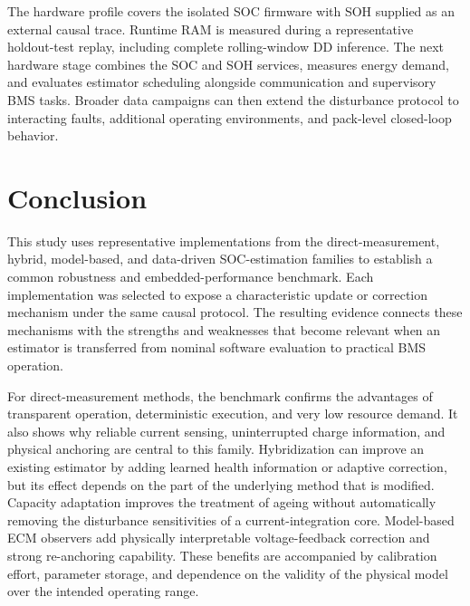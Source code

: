 \documentclass[review,nopreprintline]{elsarticle}
\begin{document}
The hardware profile covers the isolated SOC firmware with SOH supplied as an external causal trace. Runtime RAM is measured during a representative holdout-test replay, including complete rolling-window DD inference. The next hardware stage combines the SOC and SOH services, measures energy demand, and evaluates estimator scheduling alongside communication and supervisory BMS tasks. Broader data campaigns can then extend the disturbance protocol to interacting faults, additional operating environments, and pack-level closed-loop behavior.

\section{Conclusion}
This study uses representative implementations from the direct-measurement, hybrid, model-based, and data-driven SOC-estimation families to establish a common robustness and embedded-performance benchmark. Each implementation was selected to expose a characteristic update or correction mechanism under the same causal protocol. The resulting evidence connects these mechanisms with the strengths and weaknesses that become relevant when an estimator is transferred from nominal software evaluation to practical BMS operation.

For direct-measurement methods, the benchmark confirms the advantages of transparent operation, deterministic execution, and very low resource demand. It also shows why reliable current sensing, uninterrupted charge information, and physical anchoring are central to this family. Hybridization can improve an existing estimator by adding learned health information or adaptive correction, but its effect depends on the part of the underlying method that is modified. Capacity adaptation improves the treatment of ageing without automatically removing the disturbance sensitivities of a current-integration core. Model-based ECM observers add physically interpretable voltage-feedback correction and strong re-anchoring capability. These benefits are accompanied by calibration effort, parameter storage, and dependence on the validity of the physical model over the intended operating range.
\end{document}
